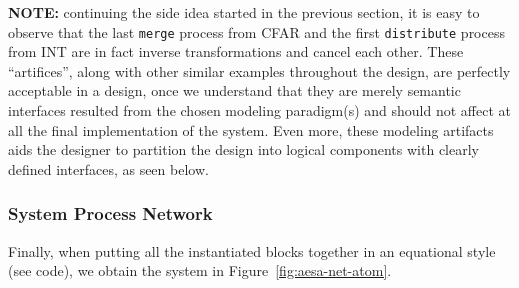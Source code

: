 \documentclass[
  a4paper,
]{article}
\newenvironment{Shaded}{}{}
\newcommand{\DataTypeTok}[1]{\textcolor[rgb]{0.56,0.13,0.00}{#1}}
\newcommand{\DecValTok}[1]{\textcolor[rgb]{0.25,0.63,0.44}{#1}}
\newcommand{\FunctionTok}[1]{\textcolor[rgb]{0.02,0.16,0.49}{#1}}
\newcommand{\KeywordTok}[1]{\textcolor[rgb]{0.00,0.44,0.13}{\textbf{#1}}}
\newcommand{\NormalTok}[1]{#1}
\newcommand{\OtherTok}[1]{\textcolor[rgb]{0.00,0.44,0.13}{#1}}
\begin{document}
\begin{Shaded}
\end{Shaded}

\textbf{NOTE:} continuing the side idea started in the previous section,
it is easy to observe that the last \texttt{merge} process from CFAR and
the first \texttt{distribute} process from INT are in fact inverse
transformations and cancel each other. These ``artifices'', along with
other similar examples throughout the design, are perfectly acceptable
in a design, once we understand that they are merely semantic interfaces
resulted from the chosen modeling paradigm(s) and should not affect at
all the final implementation of the system. Even more, these modeling
artifacts aids the designer to partition the design into logical
components with clearly defined interfaces, as seen below.

\hypertarget{system-process-network}{%
\subsubsection{System Process Network}\label{system-process-network}}

Finally, when putting all the instantiated blocks together in an
equational style (see code), we obtain the system in
Figure~\ref{fig:aesa-net-atom}.
\end{document}
